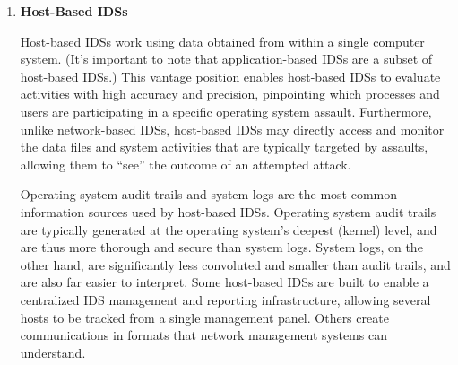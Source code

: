 \documentclass[12pt]{article}
\begin{document}
\begin{enumerate}
        \item \textbf{Host-Based IDSs}
        \par Host-based IDSs work using data obtained from within a single computer system. (It's important to note that application-based IDSs are a subset of host-based IDSs.) This vantage position enables host-based IDSs to evaluate activities with high accuracy and precision, pinpointing which processes and users are participating in a specific operating system assault. Furthermore, unlike network-based IDSs, host-based IDSs may directly access and monitor the data files and system activities that are typically targeted by assaults, allowing them to “see” the outcome of an attempted attack.
        \par Operating system audit trails and system logs are the most common information sources used by host-based IDSs. Operating system audit trails are typically generated at the operating system's deepest (kernel) level, and are thus more thorough and secure than system logs. System logs, on the other hand, are significantly less convoluted and smaller than audit trails, and are also far easier to interpret. Some host-based IDSs are built to enable a centralized IDS management and reporting infrastructure, allowing several hosts to be tracked from a single management panel. Others create communications in formats that network management systems can understand.
        

\end{enumerate}
\end{document}
